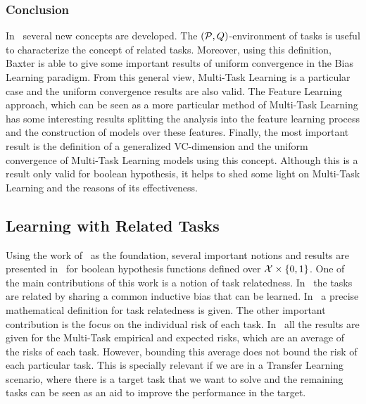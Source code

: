 \subsubsection*{Conclusion}
In~\cite{baxter2000model} several new concepts are developed. The $(\mathcal{P}, Q)$-environment of tasks is useful to characterize the concept of related tasks. Moreover, using this definition, Baxter is able to give some important results of uniform convergence in the Bias Learning paradigm. From this general view, Multi-Task Learning
is a particular case and the uniform convergence results are also valid. The Feature Learning approach, which can be seen as a more particular method of Multi-Task Learning has some interesting results splitting the analysis into the feature learning process and the construction of models over these features. Finally, the most important result is the definition of a generalized VC-dimension and the uniform convergence of Multi-Task Learning models using this concept. Although this is a result only valid for boolean hypothesis, it helps to shed some light on Multi-Task Learning and the reasons of its effectiveness.

\subsection{Learning with Related Tasks} %
Using the work of~\cite{baxter2000model} as the foundation, several important notions and results are presented in~\cite{Ben-DavidB08} for boolean hypothesis functions defined over $\mathcal{X} \times \left\{0, 1\right\}$.
One of the main contributions of this work is a notion of task relatedness. In~\cite{baxter2000model} the tasks are related by sharing a common inductive bias that can be learned. In~\cite{Ben-DavidB08} a precise mathematical definition for task relatedness is given.
The other important contribution is the focus on the individual risk of each task. In~\cite{baxter2000model} all the results are given for the Multi-Task empirical and expected risks, which are an average of the risks of each task. However, bounding this average does not bound the risk of each particular task. This is specially relevant if we are in a Transfer Learning scenario, where there is a target task that we want to solve and the remaining tasks can be seen as an aid to improve the performance in the target.

